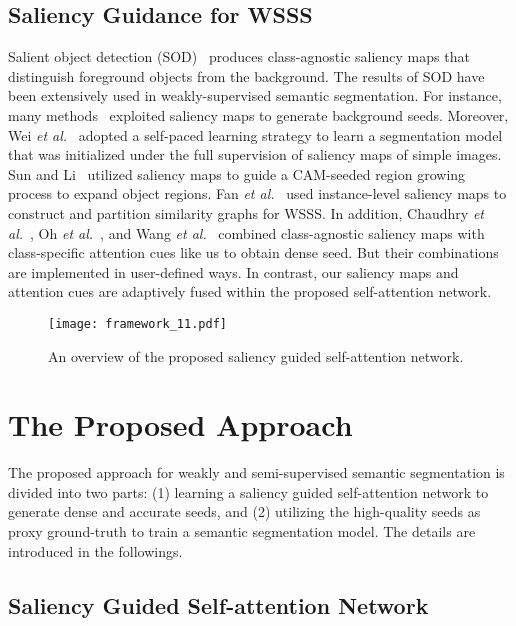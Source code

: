 \documentclass[journal]{IEEEtran}
\begin{document}
\subsection{Saliency Guidance for WSSS}
Salient object detection (SOD)~\cite{xiao2018deep} produces class-agnostic saliency maps that distinguish foreground objects from the background. The results of SOD have been extensively used in weakly-supervised semantic segmentation. For instance, many methods~\cite{wei2017object,huang2018weakly,lee2019ficklenet,fan2018cian,li2018tell,wei2018revisiting} exploited saliency maps to generate background seeds. Moreover, Wei \textit{et al.}~\cite{wei2017stc} adopted a self-paced learning strategy to learn a segmentation model that was initialized under the full supervision of saliency maps of simple images. Sun and Li~\cite{Sun2019saliency} utilized saliency maps to guide a CAM-seeded region growing process to expand object regions. Fan \textit{et al.}~\cite{fan2018associating} used instance-level saliency maps to construct and partition similarity graphs for WSSS. In addition, Chaudhry \textit{et al.}~\cite{chaudhry2017discovering}, Oh \textit{et al.}~\cite{oh2017exploiting}, and Wang \textit{et al.}~\cite{wang2018weakly} combined class-agnostic saliency maps with class-specific attention cues like us to obtain dense seed. But their combinations are implemented in user-defined ways. In contrast, our saliency maps and attention cues are adaptively fused within the proposed self-attention network. 

\begin{figure*}[tbp]
	\centering
	\texttt{[image: framework\_11.pdf]}
	\caption{An overview of the proposed saliency guided self-attention network.}
	\label{fig:architecture}
\end{figure*}



\section{The Proposed Approach}
The proposed approach for weakly and semi-supervised semantic segmentation is divided into two parts: (1) learning a saliency guided self-attention network to generate dense and accurate seeds, and (2) utilizing the high-quality seeds as proxy ground-truth to train a semantic segmentation model. The details are introduced in the followings.

\subsection{Saliency Guided Self-attention Network}
\end{document}
